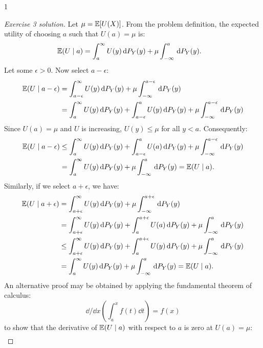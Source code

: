 \documentclass[twoside,a4paper]{article}
\def \solution {1}
\begin{document}
\if\solution 1
\begin{proof}[Exercise 3 solution]
  Let $\mu = \mathop{\mbox{\ensuremath{\mathbb{E}}}}\nolimits[U(X)]$.  From the problem definition, the expected
  utility of choosing $a$ such that $U(a) = \mu$ is:
  \begin{align*}
    \mathop{\mbox{\ensuremath{\mathbb{E}}}}\nolimits(U \mid a)
    & = 
    \int_a^\infty U(y) \, \mathrm{d}{P_Y}(y) 
    + 
    \mu \int_{-\infty}^a \, \mathrm{d}{P_Y}(y).
  \end{align*}
  Let some $\epsilon >
  0$. Now select $a - \epsilon$:
  \begin{align*}
    \mathop{\mbox{\ensuremath{\mathbb{E}}}}\nolimits(U \mid a - \epsilon)
    & = 
    \int_{a - \epsilon}^\infty U(y) \, \mathrm{d}{P_Y}(y) 
    +
    \mu \int_{-\infty}^{a-\epsilon} \, \mathrm{d}{P_Y}(y)
    \\
    & = 
    \int_a^\infty U(y) \, \mathrm{d}{P_Y}(y) 
    + 
    \int_{a-\epsilon}^a U(y) \, \mathrm{d}{P_Y}(y) 
    +
    \mu \int_{-\infty}^{a-\epsilon} \, \mathrm{d}{P_Y}(y)
  \end{align*}
  Since $U(a) = \mu$ and $U$ is increasing, $U(y) \leq
  \mu$ for all $y < a$. Consequently:
  \begin{align*}
    \mathop{\mbox{\ensuremath{\mathbb{E}}}}\nolimits(U \mid a - \epsilon)
    & \leq
    \int_a^\infty U(y) \, \mathrm{d}{P_Y}(y) 
    + 
    \int_{a-\epsilon}^a U(a) \, \mathrm{d}{P_Y}(y) 
    +
    \mu \int_{-\infty}^{a - \epsilon} \, \mathrm{d}{P_Y}(y)
    \\
    & =
    \int_a^\infty U(y) \, \mathrm{d}{P_Y}(y) 
    +
    \mu \int_{-\infty}^a \, \mathrm{d}{P_Y}(y)
    =
    \mathop{\mbox{\ensuremath{\mathbb{E}}}}\nolimits(U \mid a).
  \end{align*}
  Similarly, if we select $a + \epsilon$, we have:
  \begin{align*}
    \mathop{\mbox{\ensuremath{\mathbb{E}}}}\nolimits(U \mid a + \epsilon)
    & = 
    \int_{a+\epsilon} ^\infty U(y) \, \mathrm{d}{P_Y}(y) 
    +
    \mu \int_{-\infty}^{a + \epsilon} \, \mathrm{d}{P_Y}(y)
    \\
    & = 
    \int_{a+\epsilon} ^\infty U(y) \, \mathrm{d}{P_Y}(y) 
    +
    \int_{a}^{a + \epsilon} U(a) \, \mathrm{d}{P_Y}(y) 
    +
    \mu \int_{-\infty}^{a} \, \mathrm{d}{P_Y}(y)
    \\
    &\leq
    \int_{a+\epsilon} ^\infty U(y) \, \mathrm{d}{P_Y}(y) 
    +
    \int_{a}^{a + \epsilon} U(y) \, \mathrm{d}{P_Y}(y) 
    +
    \mu \int_{-\infty}^{a} \, \mathrm{d}{P_Y}(y)
    \\
    &=
    \int_{a} ^\infty U(y) \, \mathrm{d}{P_Y}(y) 
    +
    \mu \int_{-\infty}^{a} \, \mathrm{d}{P_Y}(y)
    = 
    \mathop{\mbox{\ensuremath{\mathbb{E}}}}\nolimits(U \mid a).
  \end{align*}
  An alternative proof may be obtained by applying the fundamental theorem of calculus:
  \[
  \dd/\dd x \left(\int_a^x f(t)\dd{t} \right)  = f(x)
  \]
  to show that the derivative of $\mathop{\mbox{\ensuremath{\mathbb{E}}}}\nolimits(U \mid a)$ with respect to $a$ is zero at $U(a) = \mu$:
  \begin{align*}

\end{align*}
\end{proof}
\end{document}
